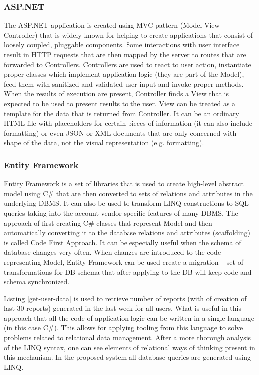 \documentclass[12pt, twoside, openany]{report}
\theoremstyle{definition}
\begin{document}
\subsubsection{ASP.NET}
The ASP.NET application is created using MVC pattern (Model-View-Controller) that is widely known for helping to create applications that consist of loosely coupled, pluggable components. Some interactions with user interface result in HTTP requests that are then mapped by the server to routes that are forwarded to Controllers. Controllers are used to react to user action, instantiate proper classes which implement application logic (they are part of the Model), feed them with sanitized and validated user input and invoke proper methods. When the results of execution are present, Controller finds a View that is expected to be used to present results to the user. View can be treated as a template for the data that is returned from Controller. It can be an ordinary HTML file with placeholders for certain pieces of information (it can also include formatting) or even JSON or XML documents that are only concerned with shape of the data, not the visual representation (e.g. formatting).

\subsubsection{Entity Framework}
Entity Framework is a set of libraries that is used to create high-level abstract model using C\# that are then converted to sets of relations and attributes in the underlying DBMS. It can also be used to transform LINQ constructions to SQL queries taking into the account vendor-specific features of many DBMS.
The approach of first creating C\# classes that represent Model and then automatically converting it to the database relations and attributes (scaffolding) is called Code First Approach. It can be especially useful when the schema of database changes very often. When changes are introduced to the code representing Model, Entity Framework can be used create a migration  -- set of transformations for DB schema that after applying to the DB will keep code and schema synchronized. 

Listing \ref{get-user-data} is used to retrieve number of reports (with of creation of last 30 reports) generated in the last week for all users. What is useful in this approach that all the code of application logic can be written in a single language (in this case C\#). This allows for applying tooling from this language to solve problems related to relational data management. After a more thorough analysis of the LINQ syntax, one can see elements of relational ways of thinking present in this mechanism. In the proposed system all database queries are generated using LINQ.
\end{document}
